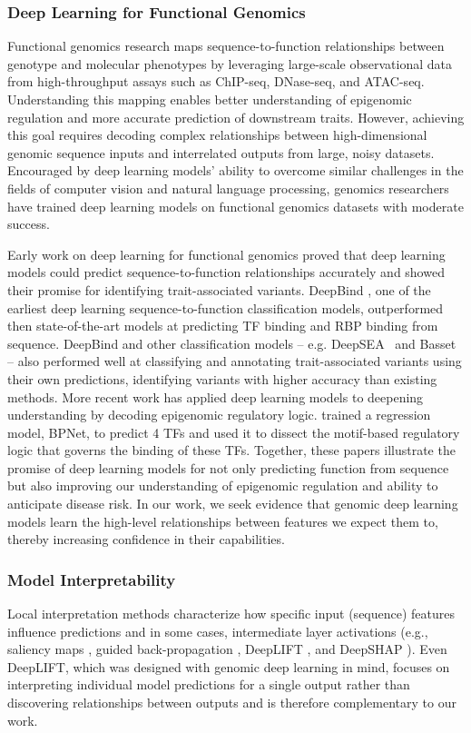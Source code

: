 \subsubsection{Deep Learning for Functional Genomics}%
Functional genomics research maps sequence-to-function relationships between genotype and molecular phenotypes by leveraging large-scale observational data from high-throughput assays such as ChIP-seq, DNase-seq, and ATAC-seq. Understanding this mapping enables better understanding of epigenomic regulation and more accurate prediction of downstream traits. However, achieving this goal requires decoding complex relationships between high-dimensional genomic sequence inputs and interrelated outputs from large, noisy datasets. Encouraged by deep learning models' ability to overcome similar challenges in the fields of computer vision and natural language processing, genomics researchers have trained deep learning models on functional genomics datasets with moderate success. 

Early work on deep learning for functional genomics proved that deep learning models could predict sequence-to-function relationships accurately and showed their promise for identifying trait-associated variants. DeepBind \citep{alipanahi2015predicting}, one of the earliest deep learning sequence-to-function classification models, outperformed then state-of-the-art models at predicting TF binding and RBP binding from sequence. DeepBind and other classification models -- e.g. DeepSEA~\citep{zhou2015predicting} and Basset~\citep{kelley2016basset} -- also performed well at classifying and annotating trait-associated variants using their own predictions, identifying variants with higher accuracy than existing methods. More recent work has applied deep learning models to deepening understanding by decoding epigenomic regulatory logic. \cite{avsec2020base} trained a regression model, BPNet, to predict 4 TFs and used it to dissect the motif-based regulatory logic that governs the binding of these TFs. Together, these papers illustrate the promise of deep learning models for not only predicting function from sequence but also improving our understanding of epigenomic regulation and ability to anticipate disease risk. In our work, we seek evidence that genomic deep learning models learn the high-level relationships between features we expect them to, thereby increasing confidence in their capabilities. 

\subsubsection{Model Interpretability}%
\label{ssub:model_interpretability}
Local interpretation methods characterize how specific input (sequence) features influence predictions and in some cases, intermediate layer activations (e.g., saliency maps \citep{simonyan2013deep}, guided back-propagation \citep{springenberg2014striving}, DeepLIFT \citep{shrikumar2017learning}, and DeepSHAP \citep{lundberg2017unified}). Even DeepLIFT, which was designed with genomic deep learning in mind, focuses on interpreting individual model predictions for a single output rather than discovering relationships between outputs and is therefore complementary to our work.

